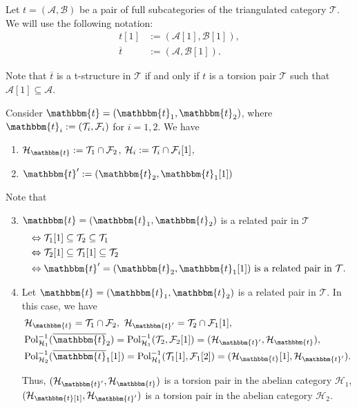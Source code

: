 Let $t=(\mathcal{A},\mathcal{B})$ be a pair of full subcategories of the triangulated
category $\mathcal{T}$. We will use the following notation:
\begin{align*}
  t[1] &:= (\mathcal{A}[1],\mathcal{B}[1]),\\
  \overline{t} &:= (\mathcal{A},\mathcal{B}[1]).
\end{align*}

Note that $\overline{t}$ is a t-structure in $\mathcal{T}$ if and only if $t$ is a torsion
pair $\mathcal{T}$ such that $\mathcal{A}[1]\subseteq\mathcal{A}$.

\begin{rmk}
  Consider $\mathbbm{t}=(\mathbbm{t}_1,\mathbbm{t}_2)$, where $\mathbbm{t}_i:=(\T_i,\F_i)$ for
  $i=1,2$. We have
  \begin{enumerate}
    \item $\mathcal{H}_\mathbbm{t}:=\T_1\cap\F_2$,
      $\mathcal{H}_i:=\mathcal{T}_i\cap\mathcal{F}_i[1]$,
    \item $\mathbbm{t}' :=(\mathbbm{t}_2,\mathbbm{t}_1[1])$
  \end{enumerate}

  Note that
  \begin{enumerate}
    \setcounter{enumi}{2}
    \item $\mathbbm{t}=(\mathbbm{t}_1,\mathbbm{t}_2)$ is a related pair in $\mathcal{T}$
      \begin{align*}
        &\Leftrightarrow \T_1[1]\subseteq\T_2\subseteq\T_1\\
        &\Leftrightarrow \T_2[1]\subseteq\T_1[1]\subseteq\T_2\\
        &\Leftrightarrow \mathbbm{t}'=(\mathbbm{t}_2,\mathbbm{t}_1[1]) \text{ is a related pair in }\mathcal{T}.
      \end{align*}
    \item Let $\mathbbm{t}=(\mathbbm{t}_1,\mathbbm{t}_2)$ is a related pair in $\mathcal{T}$. In
      this case, we have
      \begin{align*}
        &\mathcal{H}_\mathbbm{t} = \T_1\cap\F_2,~
        \mathcal{H}_{\mathbbm{t}'}=\T_2\cap \F_1[1],\\
        & \mathrm{Pol}_{\mathcal{H}_1}^{-1}(\overline{\mathbbm{t}}_2)=
        \mathrm{Pol}_{\mathcal{H}_1}^{-1}(\T_2,\F_2[1])=
        (\mathcal{H}_{\mathbbm{t}'},\mathcal{H}_{\mathbbm{t}}),\\
        &\mathrm{Pol}_{\mathcal{H}_2}^{-1}(\overline{\mathbbm{t}}_1[1])=
        \mathrm{Pol}_{\mathcal{H}_1}^{-1}(\T_1[1],\F_1[2])=
        (\mathcal{H}_{\mathbbm{t}}[1],\mathcal{H}_{\mathbbm{t}'}).
      \end{align*}

      Thus, $(\mathcal{H}_{\mathbbm{t}'},\mathcal{H}_\mathbbm{t})$ is a torsion pair in the abelian
      category $\mathcal{H}_1$,
      $(\mathcal{H}_\mathbbm{t}[1],\mathcal{H}_{\mathbbm{t}'})$ is a torsion pair in the abelian category
      $\mathcal{H}_2$.
  \end{enumerate}
\end{rmk}

